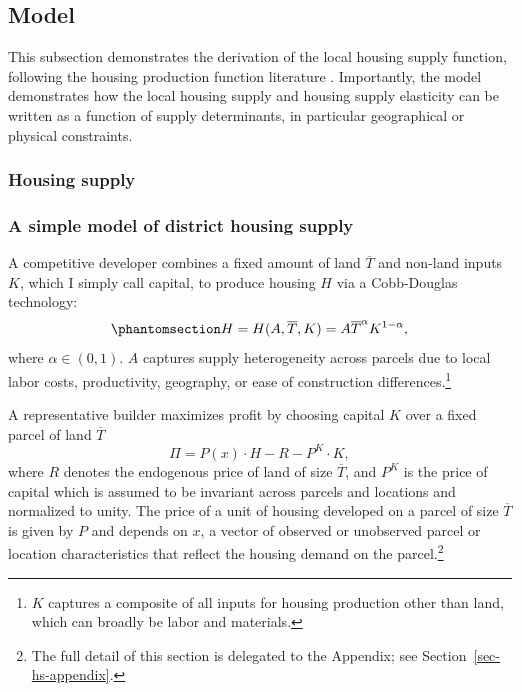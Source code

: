 \documentclass[
  12pt,
]{article}
\begin{document}
\subsection{Model}\label{model}

This subsection demonstrates the derivation of the local housing supply
function, following the housing production function literature
\citep{epple_etal_2010, combes_etal_2021}. Importantly, the model
demonstrates how the local housing supply and housing supply elasticity
can be written as a function of supply determinants, in particular
geographical or physical constraints.

\subsubsection{Housing supply}\label{housing-supply}

\subsubsection*{A simple model of district housing
supply}\label{a-simple-model-of-district-housing-supply}

A competitive developer combines a fixed amount of land \(\overline{T}\)
and non-land inputs \(K\), which I simply call capital, to produce
housing \(H\) via a Cobb-Douglas technology:
\begin{equation}\protect\phantomsection\label{eq-cobb}{
H = H(A, \overline{T}, K) = A \overline{T}^{\alpha} K^{1-\alpha}, 
}\end{equation} where \(\alpha \in (0, 1)\). \(A\) captures supply
heterogeneity across parcels due to local labor costs, productivity,
geography, or ease of construction differences.\footnote{\(K\) captures
  a composite of all inputs for housing production other than land,
  which can broadly be labor and materials.}

A representative builder maximizes profit by choosing capital \(K\) over
a fixed parcel of land \(\overline{T}\) \[
\Pi = P(x) \cdot H - R - P^K \cdot K,
\] where \(R\) denotes the endogenous price of land of size
\(\overline{T}\), and \(P^K\) is the price of capital which is assumed
to be invariant across parcels and locations and normalized to unity.
The price of a unit of housing developed on a parcel of size
\(\overline{T}\) is given by \(P\) and depends on \(x\), a vector of
observed or unobserved parcel or location characteristics that reflect
the housing demand on the parcel.\footnote{The full detail of this
  section is delegated to the Appendix; see
  Section~\ref{sec-hs-appendix}.}
\end{document}
